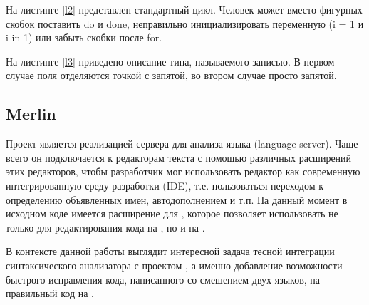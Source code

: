 \hfill


\begin{example}
	\begin{subexample}{0.5\textwidth}
		
		\caption{}
	\end{subexample}
	\begin{subexample}{0.5\textwidth}
		
		\caption{}
	\end{subexample}
\caption{}\label{l2}
\end{example}

На листинге \ref{l2} представлен стандартный цикл. Человек может вместо фигурных скобок поставить do и done, неправильно инициализировать переменную (i = 1 и i in 1) или забыть скобки после for.


\hfill


\begin{example}
	\begin{subexample}{0.5\textwidth}
		
		\caption{}
	\end{subexample}
	\begin{subexample}{0.5\textwidth}
		
		\caption{}
	\end{subexample}
\caption{}\label{l3}
\end{example}

На листинге \ref{l3} приведено описание типа, называемого записью. В первом случае поля отделяются точкой с запятой, во втором случае просто запятой.

\subsection{Merlin}

Проект \merlin{}\cite{mer} является реализацией сервера для анализа языка \OCaml{} (language server). Чаще всего он подключается к редакторам текста с помощью различных расширений этих редакторов, чтобы разработчик мог использовать редактор как современную интегрированную среду разработки (IDE), т.е. пользоваться переходом к определению объявленных имен, автодополнением и т.п. На данный момент в исходном коде \ReasonML{} имеется расширение для \merlin{}, которое позволяет использовать \merlin{} не только для редактирования кода на \OCaml{}, но и на \ReasonML{}.

В контексте данной работы выглядит интересной задача тесной интеграции синтаксического анализатора с проектом \merlin{}, а именно добавление возможности быстрого исправления кода, написанного со смешением двух языков, на правильный код на \ReasonML{}.



